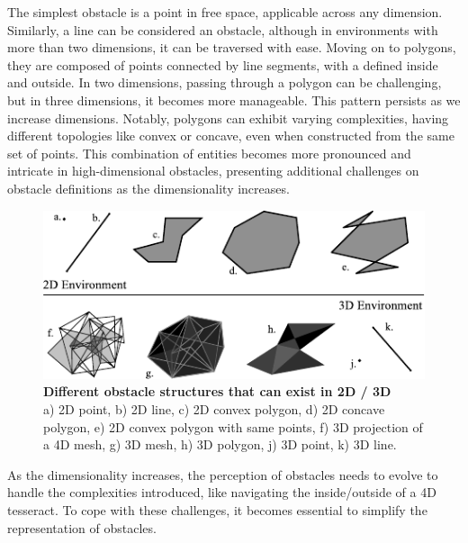 \documentclass{IEEEtaes}
\begin{document}
{The simplest obstacle is a point in free space, applicable across any dimension. Similarly, a line can be considered an obstacle, although in environments with more than two dimensions, it can be traversed with ease. Moving on to polygons, they are composed of points connected by line segments, with a defined inside and outside. In two dimensions, passing through a polygon can be challenging, but in three dimensions, it becomes more manageable. This pattern persists as we increase dimensions. Notably, polygons can exhibit varying complexities, having different topologies like convex or concave, even when constructed from the same set of points. This combination of entities becomes more pronounced and intricate in high-dimensional obstacles, presenting additional challenges on obstacle definitions as the dimensionality increases.

\begin{figure}[b]
    \vspace{-1em}
    \begin{center}    
        \includegraphics[width=0.85\linewidth]{fig-1.pdf}
    \end{center}
     \caption{\textbf{Different obstacle structures that can exist in 2D / 3D} \\
     a) 2D point, b) 2D line, c) 2D convex polygon, d) 2D concave polygon, e) 2D convex polygon with same points, f) 3D projection of a 4D mesh, g) 3D mesh, h) 3D polygon, j) 3D point, k) 3D line.}
     \label{one}
\end{figure}

As the dimensionality increases, the perception of obstacles needs to evolve to handle the complexities introduced, like navigating the inside/outside of a 4D tesseract. To cope with these challenges, it becomes essential to simplify the representation of obstacles.




}
\end{document}
